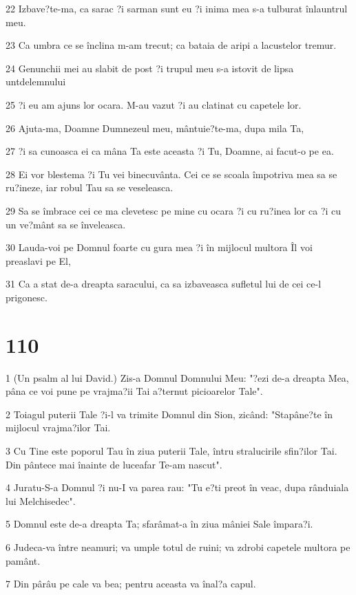 \par 22 Izbave?te-ma, ca sarac ?i sarman sunt eu ?i inima mea s-a tulburat înlauntrul meu.
\par 23 Ca umbra ce se înclina m-am trecut; ca bataia de aripi a lacustelor tremur.
\par 24 Genunchii mei au slabit de post ?i trupul meu s-a istovit de lipsa untdelemnului
\par 25 ?i eu am ajuns lor ocara. M-au vazut ?i au clatinat cu capetele lor.
\par 26 Ajuta-ma, Doamne Dumnezeul meu, mântuie?te-ma, dupa mila Ta,
\par 27 ?i sa cunoasca ei ca mâna Ta este aceasta ?i Tu, Doamne, ai facut-o pe ea.
\par 28 Ei vor blestema ?i Tu vei binecuvânta. Cei ce se scoala împotriva mea sa se ru?ineze, iar robul Tau sa se veseleasca.
\par 29 Sa se îmbrace cei ce ma clevetesc pe mine cu ocara ?i cu ru?inea lor ca ?i cu un ve?mânt sa se înveleasca.
\par 30 Lauda-voi pe Domnul foarte cu gura mea ?i în mijlocul multora Îl voi preaslavi pe El,
\par 31 Ca a stat de-a dreapta saracului, ca sa izbaveasca sufletul lui de cei ce-l prigonesc.

\chapter{110}

\par 1 (Un psalm al lui David.) Zis-a Domnul Domnului Meu: "?ezi de-a dreapta Mea, pâna ce voi pune pe vrajma?ii Tai a?ternut picioarelor Tale".
\par 2 Toiagul puterii Tale ?i-l va trimite Domnul din Sion, zicând: "Stapâne?te în mijlocul vrajma?ilor Tai.
\par 3 Cu Tine este poporul Tau în ziua puterii Tale, întru stralucirile sfin?ilor Tai. Din pântece mai înainte de luceafar Te-am nascut".
\par 4 Juratu-S-a Domnul ?i nu-I va parea rau: "Tu e?ti preot în veac, dupa rânduiala lui Melchisedec".
\par 5 Domnul este de-a dreapta Ta; sfarâmat-a în ziua mâniei Sale împara?i.
\par 6 Judeca-va între neamuri; va umple totul de ruini; va zdrobi capetele multora pe pamânt.
\par 7 Din pârâu pe cale va bea; pentru aceasta va înal?a capul.

